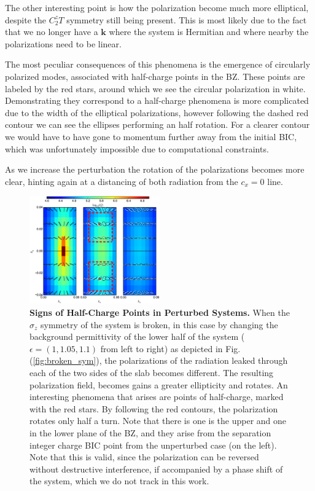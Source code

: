 The other interesting point is how the polarization become much more elliptical, despite the $C_2^z T$ symmetry still being present. This is most likely due to the fact that we no longer have a $\bm{k}$ where the system is Hermitian and where nearby the polarizations need to be linear.

The most peculiar consequences of this phenomena is the emergence of circularly polarized modes, associated with half-charge points in the BZ. These points are labeled by the red stars, around which we see the circular polarization in white. Demonstrating they correspond to a half-charge phenomena is more complicated due to the width of the elliptical  polarizations, however following the dashed red contour we can see the ellipses performing an half rotation. For a clearer contour we would have to have gone to momentum further away from the initial BIC, which was unfortunately impossible due to computational constraints.

As we increase the perturbation the rotation of the polarizations becomes more clear, hinting again at a distancing of both radiation from the $c_x=0$ line.

\begin{figure}
  \centering  
\includegraphics[width=0.5\textwidth]{Figures/Sigma_z_all-cropped.pdf}
  \caption{{\bf Signs of Half-Charge Points in Perturbed Systems.} When the $\sigma_z$ symmetry of the system is broken, in this case by changing the background permittivity of the lower half of the system ($\epsilon = (1,1.05, 1.1)$ from left to right) as depicted in Fig.(\ref{fig:broken_sym}), the polarizations of the radiation leaked through each of the two sides of the slab becomes different. The resulting polarization field, becomes gains a greater ellipticity and rotates. An interesting phenomena that arises are points of half-charge, marked with the red stars. By following the red contours, the polarization rotates only half a turn. Note that there is one is the upper and one in the lower plane of the BZ, and they arise from the separation integer charge BIC point from the unperturbed case (on the left). Note that this is valid, since the polarization can be reversed without destructive interference, if accompanied by a phase shift of the system, which we do not track in this work.}
  \label{fig:sigma_z}
\end{figure}

